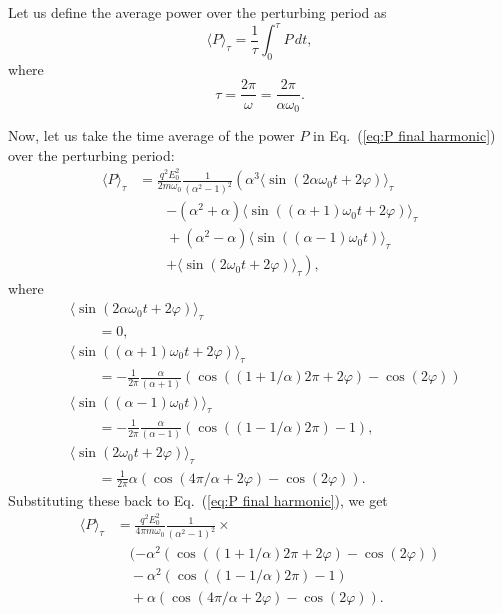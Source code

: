 \documentclass[twocolumn,showpacs,preprintnumbers,amsmath,amssymb]{revtex4}
\begin{document}
Let us define the average power over the perturbing period as
\begin{equation}
\langle P\rangle_\tau = \frac{1}{\tau}\int_0^{\tau}P\,dt,
\end{equation}
where
\begin{equation}
\tau = \frac{2\pi}{\omega} = \frac{2\pi}{\alpha\omega_0}.
\end{equation}

Now, let us take the time average of the power $P$ in Eq.~(\ref{eq:P final harmonic}) over the perturbing period:
\begin{align}
\label{eq:P final harmonic}
\langle P\rangle_\tau &= \frac{q^2E_0^2}{2m\omega_0}\frac{1}{(\alpha^2 - 1)^2}\left(\alpha^3\langle\sin(2\alpha\omega_0t + 2\varphi)\rangle_\tau \right. \nonumber\\ 
&\qquad \left.- (\alpha^2 +\alpha)\langle\sin((\alpha + 1)\omega_0t + 2\varphi)\rangle_\tau\right.\nonumber\\
&\qquad +\left. (\alpha^2 -\alpha)\langle\sin((\alpha -1)\omega_0t)\rangle_\tau \right.\nonumber \\
&\qquad \left.+ \langle\sin(2\omega_0t +2\varphi)\rangle_\tau\right),
\end{align}
where
\begin{subequations}
\begin{align}
&\langle\sin(2\alpha\omega_0t + 2\varphi)\rangle_\tau \nonumber \\
&\qquad  = 0,\\
&\langle\sin((\alpha + 1)\omega_0t + 2\varphi)\rangle_\tau  \nonumber\\ 
&\qquad = -\frac{1}{2\pi}\frac{\alpha}{(\alpha + 1)}  (\cos((1 + 1/\alpha)2\pi + 2\varphi) - \cos(2\varphi)) \\
&\langle\sin((\alpha -1)\omega_0t)\rangle_\tau  \nonumber \\
&\qquad = -\frac{1}{2\pi}\frac{\alpha}{(\alpha - 1)}(\cos((1 - 1/\alpha)2\pi) - 1),\\
&\langle\sin(2\omega_0t +2\varphi)\rangle_\tau\nonumber \\
&\qquad  = \frac{1}{2\pi}\alpha(\cos(4\pi/\alpha + 2\varphi) - \cos(2\varphi)).
\end{align}
\end{subequations}
Substituting these back to Eq.~(\ref{eq:P final harmonic}), we get
\begin{align}
\langle P\rangle_\tau &= \frac{q^2E_0^2}{4\pi m\omega_0}\frac{1}{(\alpha^2 - 1)^2}\times \nonumber \\
&\quad (-\alpha^2(\cos((1 + 1/\alpha)2\pi + 2\varphi) - \cos(2\varphi))\nonumber\\
&\quad-\alpha^2(\cos((1 - 1/\alpha)2\pi) - 1) \nonumber\\
&\quad +\alpha(\cos(4\pi/\alpha + 2\varphi) - \cos(2\varphi)).
\end{align}
\end{document}
